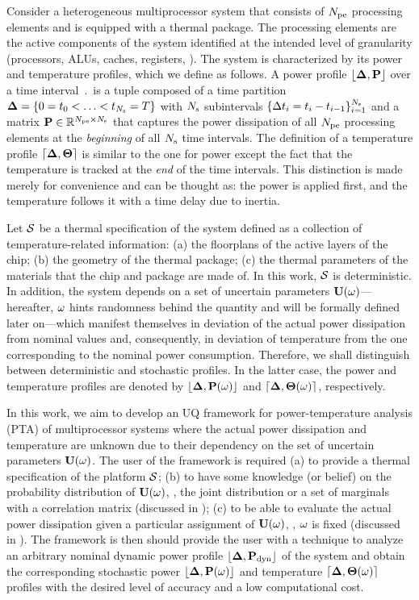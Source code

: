 Consider a heterogeneous multiprocessor system that consists of ${N_\text{pe}}$ processing elements and is equipped with a thermal package. The processing elements are the active components of the system identified at the intended level of granularity (processors, ALUs, caches, registers, \etc). The system is characterized by its power and temperature profiles, which we define as follows. A power profile $\profP$ over a time interval $\period$ is a tuple composed of a time partition $\boldsymbol{\Delta} = \{ 0 = t_0 < \dotsc < t_{N_\text{s}} = T \}$ with $N_\text{s}$ subintervals $\{ \Delta t_i = t_i - t_{i - 1} \}_{i = 1}^{N_\text{s}}$ and a matrix $\mP \in \real^{\cores \times \steps}$ that captures the power dissipation of all ${N_\text{pe}}$ processing elements at the \emph{beginning} of all $N_\text{s}$ time intervals. The definition of a temperature profile $\profT$ is similar to the one for power except the fact that the temperature is tracked at the \emph{end} of the time intervals. This distinction is made merely for convenience and can be thought as: the power is applied first, and the temperature follows it with a time delay due to inertia.

Let $\mathcal{S}$ be a thermal specification of the system defined as a collection of temperature-related information: (a) the floorplans of the active layers of the chip; (b) the geometry of the thermal package; (c) the thermal parameters of the materials that the chip and package are made of. In this work, $\mathcal{S}$ is deterministic. In addition, the system depends on a set of uncertain parameters $\mathbf{U}(\omega)$---hereafter, $\omega$ hints randomness behind the quantity and will be formally defined later on---which manifest themselves in deviation of the actual power dissipation from nominal values and, consequently, in deviation of temperature from the one corresponding to the nominal power consumption. Therefore, we shall distinguish between deterministic and stochastic profiles. In the latter case, the power and temperature profiles are denoted by $\profP{\o}$ and $\profT{\o}$, respectively.

In this work, we aim to develop an UQ framework for power-temperature analysis (PTA) of multiprocessor systems where the actual power dissipation and temperature are unknown due to their dependency on the set of uncertain parameters $\mathbf{U}(\omega)$. The user of the framework is required (a) to provide a thermal specification of the platform $\mathcal{S}$; (b) to have some knowledge (or belief) on the probability distribution of $\mathbf{U}(\omega)$, \eg, the joint distribution or a set of marginals with a correlation matrix (discussed in ); (c) to be able to evaluate the actual power dissipation given a particular assignment of $\mathbf{U}(\omega)$, \ie, $\omega$ is fixed (discussed in ). The framework is then should provide the user with a technique to analyze an arbitrary nominal dynamic power profile $\profPdyn$ of the system and obtain the corresponding stochastic power $\profP{\o}$ and temperature $\profT{\o}$ profiles with the desired level of accuracy and a low computational cost.

